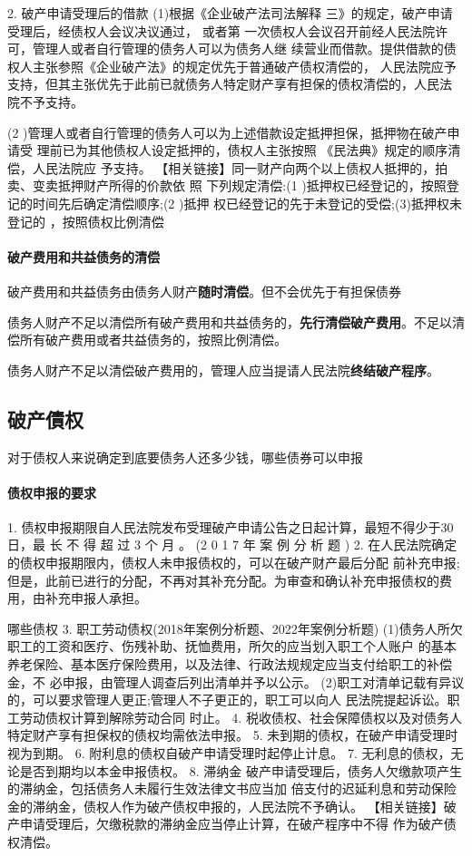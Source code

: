 \documentclass[UTF8,12pt]{ctexart}
\numberwithin{equation}{section} %
\numberwithin{figure}{section}
\numberwithin{table}{section}
\begin{document}
	2. 破产申请受理后的借款
	(1)根据《企业破产法司法解释 三》的规定，破产申请受理后，经债权人会议决议通过， 或者第 一次债权人会议召开前经人民法院许可，管理人或者自行管理的债务人可以为债务人继 续营业而借款。提供借款的债权人主张参照《企业破产法》的规定优先于普通破产债权清偿的， 人民法院应予支持，但其主张优先于此前已就债务人特定财产享有担保的债权清偿的，人民法 院不予支持。
	
	
	(2 )管理人或者自行管理的债务人可以为上述借款设定抵押担保，抵押物在破产申请受 理前已为其他债权人设定抵押的，债权人主张按照 《民法典》规定的顺序清偿，人民法院应 予支持。
	【相关链接】同一财产向两个以上债权人抵押的，拍卖、变卖抵押财产所得的价款依 照 下列规定清偿:(1 )抵押权已经登记的，按照登记的时间先后确定清偿顺序;(2 )抵押 权已经登记的先于未登记的受偿;(3)抵押权未登记的 ，按照债权比例清偿
	
	\paragraph{破产费用和共益债务的清偿}
	破产费用和共益债务由债务人财产\textbf{随时清偿}。但不会优先于有担保债券
	
	债务人财产不足以清偿所有破产费用和共益债务的，\textbf{先行清偿破产费用}。不足以清偿所有破产费用或者共益债务的，按照比例清偿。

	债务人财产不足以清偿破产费用的，管理人应当提请人民法院\textbf{终结破产程序}。
	
	
	\subsection{破产債权}
	对于债权人来说确定到底要债务人还多少钱，哪些债券可以申报
	\paragraph{债权申报的要求}
	1. 债权申报期限自人民法院发布受理破产申请公告之日起计算，最短不得少于30 日，最 长 不 得 超 过 3 个 月 。 (2 0 1 7 年 案 例 分 析 题 )
	2. 在人民法院确定的债权申报期限内，债权人未申报债权的，可以在破产财产最后分配 前补充申报;但是，此前已进行的分配，不再对其补充分配。为审查和确认补充申报债权的费 用，由补充申报人承担。
	
	哪些债权
	3. 职工劳动债权(2018年案例分析题、2022年案例分析题) (1)债务人所欠职工的工资和医疗、伤残补助、抚恤费用，所欠的应当划入职工个人账户 的基本养老保险、基本医疗保险费用，以及法律、行政法规规定应当支付给职工的补偿金，不 必申报，由管理人调查后列出清单并予以公示。 (2)职工对清单记载有异议的，可以要求管理人更正;管理人不子更正的，职工可以向人 民法院提起诉讼。职工劳动债权计算到解除劳动合同 时止。
	4. 税收债权、社会保障债权以及对债务人特定财产享有担保权的债权均需依法申报。
	5. 未到期的债权，在破产申请受理时视为到期。
	6. 附利息的债权自破产申请受理时起停止计息。
	7. 无利息的债权，无论是否到期均以本金申报债权。
	8. 滞纳金 破产申请受理后，债务人欠缴款项产生的滞纳金，包括债务人未履行生效法律文书应当加 倍支付的迟延利息和劳动保险金的滞纳金，债权人作为破产债权申报的，人民法院不予确认。
	【相关链接】破产申请受理后，欠缴税款的滞纳金应当停止计算，在破产程序中不得 作为破产债权清偿。
	
\end{document}
